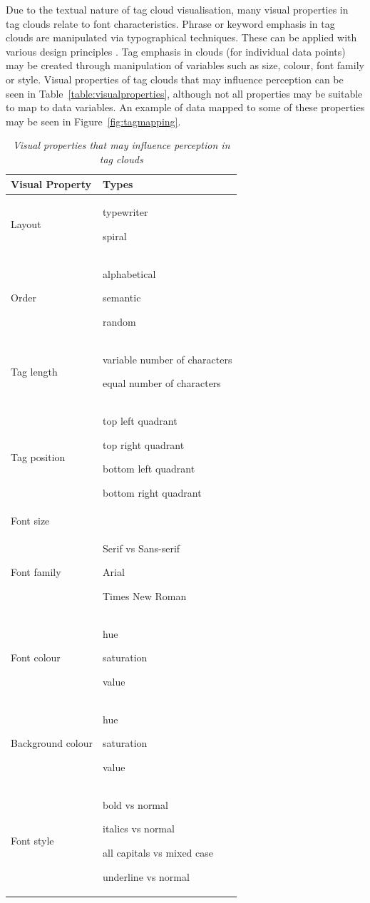 Due to the textual nature of tag cloud visualisation, many visual properties in tag clouds relate to font characteristics. Phrase or keyword emphasis in tag clouds are manipulated via typographical techniques. These can be applied with various design principles \citep[such as those outlined in the seminal manual ``The elements of typographical style''][]{bringhurst01}. Tag emphasis in clouds (for individual data points) may be created through manipulation of variables such as size, colour, font family or style. Visual properties of tag clouds that may influence perception can be seen in Table~\vref{table:visualproperties}, although not all properties may be suitable to map to data variables. An example of data mapped to some of these properties may be seen in Figure~\vref{fig:tagmapping}.

\begin{table}
\centering
\caption{\textit{Visual properties that may influence perception in tag clouds}}
\begin{tabular}{|p{4cm}|p{8cm}|} \hline
\textbf{Visual Property}&\textbf{Types}\\ \hline
Layout & typewriter\par spiral\\ \hline
Order & alphabetical\par semantic\par random\\ \hline
Tag length & variable number of characters\par equal number of characters\\ \hline
Tag position & top left quadrant\par top right quadrant\par bottom left quadrant\par bottom right quadrant\\ \hline
Font size & \\ \hline
Font family& Serif vs Sans-serif\par Arial\par Times New Roman \\ \hline
Font colour & hue\par saturation\par value \\ \hline
Background colour & hue\par saturation\par value \\ \hline
Font style & bold vs normal\par italics vs normal\par all capitals vs mixed case\par underline vs normal   \\ 
\hline\end{tabular}
\label{table:visualproperties}
\end{table}

